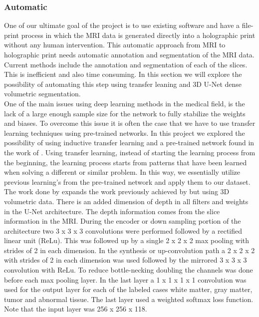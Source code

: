 \subsubsection{Automatic}

One of our ultimate goal of the project is to use existing software and have a file-print process in which the MRI data is generated directly into a holographic print without any human intervention.  This automatic approach from MRI to holographic print needs automatic annotation and segmentation of the MRI data.  Current methods include the annotation and segmentation of each of the slices. This is inefficient and also time consuming. In this section we will explore the possibility of automating this step using transfer leaning and 3D U-Net dense volumetric segmentation\cite{cciccek20163d}.\\

One of the main issues using deep learning methods in the medical field, is the lack of a large enough sample size for the network to fully stabilize the weights and biases.  To overcome this issue it is often the case that we have to use transfer learning techniques using pre-trained networks.  In this project we explored the possibility of using inductive transfer learning\cite{pan2010survey} and a pre-trained network found in the work of \cite{cciccek20163d}.  Using transfer learning, instead of starting the learning process from the beginning, the learning process starts from patterns that have been learned when solving a different or similar problem. In this way, we essentially utilize previous learning's from the pre-trained network and apply them to our dataset.\\

The work done by \cite{cciccek20163d} expands the work previously achieved by \cite{ronneberger2015u} but using 3D volumetric data.  There is an added dimension of depth in all filters and weights in the U-Net architecture.  The depth information comes from the slice information in the MRI. During the encoder or down sampling portion of the architecture two 3 x 3 x 3 convolutions were performed followed by a rectified linear unit (ReLu).  This was followed up by a single 2 x 2 x 2 max pooling with strides of 2 in each dimension.  In the synthesis or up-convolution path a 2 x 2 x 2 with strides of 2 in each dimension was used followed by the mirrored 3 x 3 x 3 convolution with ReLu.  To reduce bottle-necking doubling the channels was done before each max pooling layer.  In the last layer a 1 x 1 x 1 x 1 convolution was used for the output layer for each of the labeled cases white matter, gray matter, tumor and abnormal tissue. The last layer used a weighted softmax loss function.  Note that the input layer was 256 x 256 x 118.

